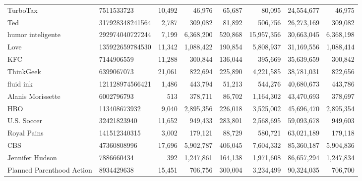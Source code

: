 \begin{longtable}{llrrrrrr}
                                          TurboTax &       7511533723 &  10,492 &      46,976 &     65,687 &      80,095 &  24,554,677 &    46,975 \\
                                               Ted &  317928348241564 &   2,787 &     309,082 &     81,892 &     506,756 &  26,273,169 &   309,082 \\
                                 humor inteligente &  292974040727244 &   7,199 &   6,368,200 &    520,868 &  15,957,356 &  30,663,045 & 6,368,198 \\
                                              Love &  135922659784530 &  11,342 &   1,088,422 &    190,854 &   5,808,937 &  31,169,556 & 1,088,414 \\
                                               KFC &       7144906559 &  11,288 &     300,844 &    136,044 &     395,669 &  35,639,659 &   300,842 \\
                                         ThinkGeek &       6399067073 &  21,061 &     822,694 &    225,890 &   4,221,585 &  38,781,031 &   822,656 \\
                                         fluid ink &  121128974566421 &   1,486 &     443,794 &     51,213 &     544,276 &  40,680,673 &   443,786 \\
                                 Alanis Morissette &       6002796793 &     513 &     378,711 &     86,702 &   1,164,302 &  43,470,693 &   378,697 \\
                                               HBO &     113408673932 &   9,040 &   2,895,356 &    226,018 &   3,525,002 &  45,696,470 & 2,895,354 \\
                                       U.S. Soccer &      32421823940 &  11,652 &     949,433 &    283,801 &   2,568,695 &  59,093,678 &   949,603 \\
                                       Royal Pains &     141512340315 &   3,002 &     179,121 &     88,729 &     580,721 &  63,021,189 &   179,118 \\
                                               CBS &      47360808996 &  17,696 &   5,902,787 &    406,045 &   7,604,332 &  85,360,187 & 5,904,836 \\
                                   Jennifer Hudson &       7886660434 &     392 &   1,247,861 &    164,138 &   1,971,608 &  86,657,294 & 1,247,834 \\
                         Planned Parenthood Action &       8934429638 &  15,451 &     706,756 &    300,004 &   3,234,499 &  90,324,035 &   706,700 \\

\end{longtable}
